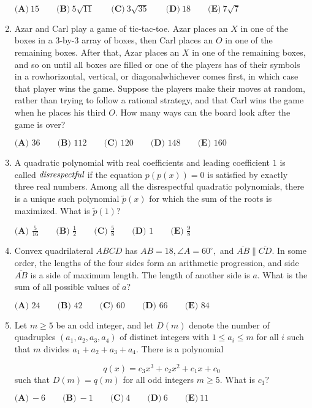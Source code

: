 \documentclass{article}
\begin{document}
\begin{enumerate}[label=\arabic*., itemsep=0.5em]
$\textbf{(A)}\: 15\qquad\textbf{(B)} \: 5\sqrt{11}\qquad\textbf{(C)} \: 3\sqrt{35}\qquad\textbf{(D)} \: 18\qquad\textbf{(E)} \: 7\sqrt{7}$\par \vspace{0.5em}\item Azar and Carl play a game of tic-tac-toe. Azar places an $X$ in one of the boxes in a $3$-by-$3$ array of boxes, then Carl places an $O$ in one of the remaining boxes. After that, Azar places an $X$ in one of the remaining boxes, and so on until all boxes are filled or one of the players has of their symbols in a rowhorizontal, vertical, or diagonalwhichever comes first, in which case that player wins the game. Suppose the players make their moves at random, rather than trying to follow a rational strategy, and that Carl wins the game when he places his third $O$. How many ways can the board look after the game is over?

$\textbf{(A) } 36 \qquad\textbf{(B) } 112 \qquad\textbf{(C) } 120 \qquad\textbf{(D) } 148 \qquad\textbf{(E) } 160$\par \vspace{0.5em}\item A quadratic polynomial with real coefficients and leading coefficient $1$ is called $\emph{disrespectful}$ if the equation $p(p(x))=0$ is satisfied by exactly three real numbers. Among all the disrespectful quadratic polynomials, there is a unique such polynomial $\tilde{p}(x)$ for which the sum of the roots is maximized. What is $\tilde{p}(1)$?

$\textbf{(A) } \frac{5}{16} \qquad\textbf{(B) } \frac{1}{2} \qquad\textbf{(C) } \frac{5}{8} \qquad\textbf{(D) } 1 \qquad\textbf{(E) } \frac{9}{8}$\par \vspace{0.5em}\item Convex quadrilateral $ABCD$ has $AB = 18, \angle{A} = 60^\circ,$ and $\overline{AB} \parallel \overline{CD}.$ In some order, the lengths of the four sides form an arithmetic progression, and side $\overline{AB}$ is a side of maximum length. The length of another side is $a.$ What is the sum of all possible values of $a$?

$\textbf{(A) } 24 \qquad \textbf{(B) } 42 \qquad \textbf{(C) } 60 \qquad \textbf{(D) } 66 \qquad \textbf{(E) } 84$\par \vspace{0.5em}\item Let $m\ge 5$ be an odd integer, and let $D(m)$ denote the number of quadruples $(a_1, a_2, a_3, a_4)$ of distinct integers with $1\le a_i \le m$ for all $i$ such that $m$ divides $a_1+a_2+a_3+a_4$. There is a polynomial

\begin{equation*}
q(x) = c_3x^3+c_2x^2+c_1x+c_0
\end{equation*}
such that $D(m) = q(m)$ for all odd integers $m\ge 5$. What is $c_1?$

$\textbf{(A)}\ {-}6\qquad\textbf{(B)}\ {-}1\qquad\textbf{(C)}\ 4\qquad\textbf{(D)}\ 6\qquad\textbf{(E)}\ 11$\par \vspace{0.5em}\end{enumerate}
\end{document}
